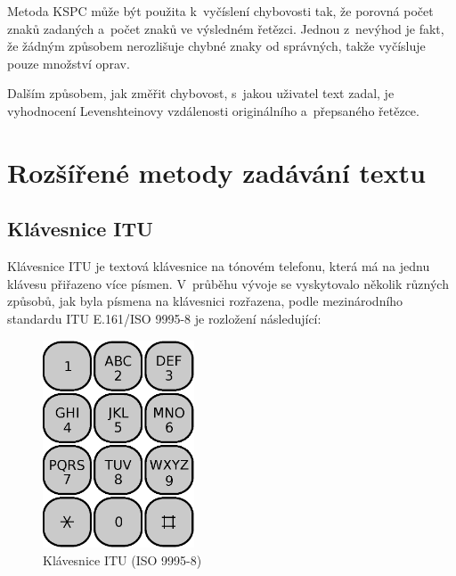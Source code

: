 \documentclass[a4paper,11pt,openany]{book} %
\begin{document}
Metoda KSPC může být použita k~vyčíslení chybovosti tak, že porovná počet znaků zadaných a~počet znaků ve výsledném řetězci. Jednou z~nevýhod je fakt, že žádným způsobem nerozlišuje chybné znaky od správných, takže vyčísluje pouze množství oprav. %

Dalším způsobem, jak změřit chybovost, s~jakou uživatel text zadal, je vyhodnocení Levenshteinovy vzdálenosti originálního a~přepsaného řetězce. \parencite{soukoreff2001measuring} %

\chapter{Rozšířené metody zadávání textu}\label{input-methods}

\section{Klávesnice ITU}\label{itu-kb}

Klávesnice ITU je textová klávesnice na tónovém telefonu, která má na jednu klávesu přiřazeno více písmen. V~průběhu vývoje se vyskytovalo několik různých způsobů, jak byla písmena na klávesnici rozřazena, podle mezinárodního standardu ITU E.161/ISO 9995-8 je rozložení následující: %

\begin{figure}[h]
	\centering
	\includegraphics[width=0.4\textwidth]{telephone-keypad.eps}
	\caption{Klávesnice ITU (ISO 9995-8)\protect\footnotemark}
	\label{fig:phoneKeyboard}
\end{figure}

\end{document}
